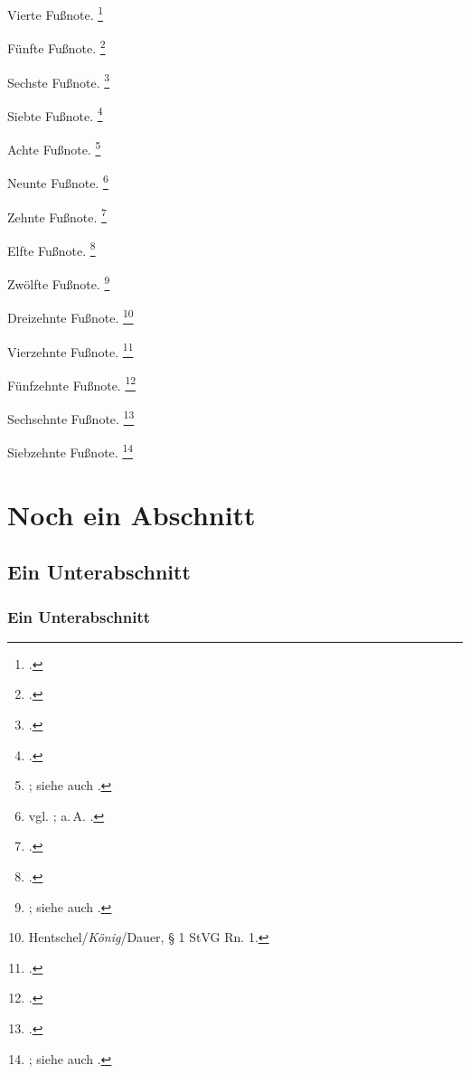 \documentclass{hausarbeit-jura}
\begin{document}
Vierte Fußnote. \footcite{stamm:verzinsung}

Fünfte Fußnote. \footcite[3]{stamm:zweiter}

Sechste Fußnote. \footcite[vgl.][517]{gehrlein:vollstreckung}

Siebte Fußnote. \footcite[(Ellenberger)§~119 Rn.~4]{palandt}

Achte Fußnote. \footnote{\cite[(Flechtner)§~2059 BGB Rn.~1]{erbr}; siehe auch \cite[(Kindler)Vorbem. §§~1--7 (Kaufmannsbegriff) Rn.~3]{ebjs1}.}

Neunte Fußnote. \footnote{vgl. \cite[Schmidt-Aßmann][Art.~19 Abs.~4 Rn.~36]{maunzduerig}; a.\,A. \cite[Diemer][§~151 Rn.~2]{kkstpo}.}

Zehnte Fußnote. \footcite[Matusche-Beckmann][§~5 Rn.~14]{hdbversr}

Elfte Fußnote. \footcite[(Matusche-Beckmann)§~5 Rn.~14 (falsch zitiert)]{hdbversr}

Zwölfte Fußnote. \footnote{\cite[(Bearbeiter)§~433 Rn.~23]{staudinger}; siehe auch \cite[(Bearbeiter)§~123 Rn.~12]{muekobgb}.}

Dreizehnte Fußnote. \footnote{Hentschel/\emph{König}/Dauer, § 1 StVG Rn. 1.}

Vierzehnte Fußnote. \footcite[Rn. 3]{viiizr255.17}

Fünfzehnte Fußnote. \footcite[Rn. 15]{1str346.18}

Sechsehnte Fußnote. \footcite[3535]{1str346.18.2}

Siebzehnte Fußnote. \footnote{\cite[56]{laack:infra}; siehe auch \cite[401]{beckemper:unvernunft}.}

\section{Noch ein Abschnitt}
\blindtext

\subsection{Ein Unterabschnitt}
\blindtext

\subsubsection{Ein Unterabschnitt}
\blindtext

\blindtext

\blindtext

\blindtext
\end{document}
